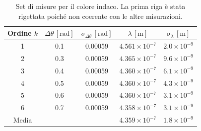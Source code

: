 \documentclass[a4paper,12pt]{article}
\begin{document}
\begin{table}[H]
\centering
\begin{tabular}{|c|c|c|c|c|}
\hline
Ordine \(k\)  & \(\Delta \theta \, [\text{rad}]\) & \(\sigma_{\Delta \theta} \, [\text{rad}]\) & \(\lambda \, [\text{m}]\) & \(\sigma_\lambda \, [\text{m}]\) \\ 
\hline
1 & 0.1 & 0.00059 & \(4.561 \times 10^{-7}\) & \(2.0 \times 10^{-9}\) \\ 
2 & 0.3 & 0.00059 & \(4.365 \times 10^{-7}\) & \(9.6 \times 10^{-9}\) \\ 
3 & 0.4 & 0.00059 & \(4.360 \times 10^{-7}\) & \(6.1 \times 10^{-9}\) \\ 
4 & 0.5 & 0.00059 & \(4.360 \times 10^{-7}\) & \(4.3 \times 10^{-9}\) \\ 
5 & 0.6 & 0.00059 & \(4.360 \times 10^{-7}\) & \(3.1 \times 10^{-9}\) \\ 
6 & 0.7 & 0.00059 & \(4.358 \times 10^{-7}\) & \(3.1 \times 10^{-9}\) \\ 
\hline
Media & & & \(4.359 \times 10^{-7}\) & \(1.8 \times 10^{-9}\) \\ 
\hline
\end{tabular}
\caption{Set di misure per il colore indaco. La prima riga è stata rigettata poiché non coerente con le altre misurazioni.}
\end{table}
\end{document}
